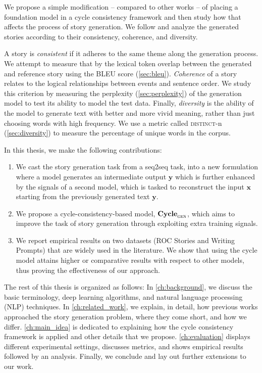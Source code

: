 We propose a simple modification -- compared to other works -- of placing a foundation model in a cycle consistency framework and then study how that affects the process of story generation. We follow \citep{hou2019survey} and analyze the generated stories according to their consistency, coherence, and diversity.

A story is \textit{consistent} if it adheres to the same theme along the generation process. We attempt to measure that by the lexical token overlap between the generated and reference story using the BLEU score (\cref{sec:bleu}). \textit{Coherence} of a story relates to the logical relationships between events and sentence order. We study this criterion by measuring the perplexity (\cref{sec:perplexity}) of the generation model to test its ability to model the test data. %
Finally, \textit{diversity} is the ability of the model to generate text with better and more vivid meaning, rather than just choosing words with high frequency. We use a metric called \textsc{distinct}-n (\cref{sec:diversity}) to measure the percentage of unique words in the corpus.

In this thesis, we make the following contributions:

\begin{enumerate}
\item We cast the story generation task from a seq2seq task, into a new formulation where a model generates an intermediate output $\mathbf{y}$ which is further enhanced by the signals of a second model, which is tasked to reconstruct the input $\mathbf{x}$ starting from the previously generated text $\mathbf{y}$.

\item We propose a cycle-consistency-based model, $\textbf{Cycle}_{\textsc{gen}}$, which aims to improve the task of story generation through exploiting extra training signals.

\item We report empirical results on two datasets (ROC Stories and Writing Prompts) that are widely used in the literature. We show that using the cycle model attains higher or comparative results with respect to other models, thus proving the effectiveness of our approach.
\end{enumerate}

The rest of this thesis is organized as follows: In \cref{ch:background}, we discuss the basic terminology, deep learning algorithms, and natural language processing (NLP) techniques. In \cref{ch:related_work}, we explain, in detail, how previous works approached the story generation problem, where they come short, and how we differ. \cref{ch:main_idea} is dedicated to explaining how the cycle consistency framework is applied and other details that we propose. \cref{ch:evaluation} displays different experimental settings, discusses metrics, and shows empirical results followed by an analysis. Finally, we conclude and lay out further extensions to our work.

